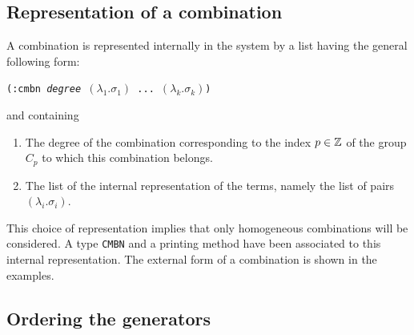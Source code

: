 \subsection {Representation of a combination}

A combination is represented internally in the system by a  list 
having the general following form:
\begin{center}
{\tt (:cmbn {\em degree} $(\lambda_1.\sigma_1)$ ... $(\lambda_k.\sigma_k)$)}
\end{center}
and containing
\begin{enumerate}
\item The degree of the combination  corresponding to the index $p \in {\Bbb Z}$  of the group 
$C_p$ to which this combination belongs.
\item The  list of the internal representation of the terms, namely the list of pairs $(\lambda_i.\sigma_i)$.
\end{enumerate}
This choice of representation implies that only homogeneous combinations
will be considered. A type {\tt CMBN} and 
a printing method have been associated to this internal representation. The external
form of a combination is shown in the  examples. 

\subsection {Ordering the generators}


